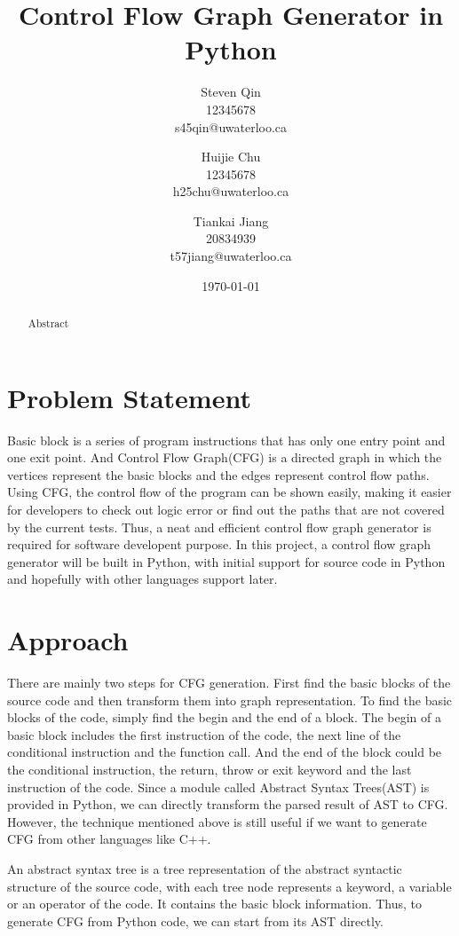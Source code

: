 \documentclass[11pt]{article}
\title{Control Flow Graph Generator in Python}
\author{Steven Qin\\12345678\\s45qin@uwaterloo.ca \and Huijie Chu\\12345678\\h25chu@uwaterloo.ca \and Tiankai Jiang\\20834939\\t57jiang@uwaterloo.ca}
\date{\today}
\begin{document}
\maketitle

\begin{abstract}
Abstract
\end{abstract}

\section{Problem Statement}\label{section-problemStatement}
Basic block is a series of program instructions that has only one entry point and one exit point. And Control Flow Graph(CFG) is a directed graph in which the vertices represent the basic blocks and the edges represent control flow paths. Using CFG, the control flow of the program can be shown easily, making it easier for developers to check out logic error or find out the paths that are not covered by the current tests. Thus, a neat and efficient control flow graph generator is required for software developent purpose. In this project, a control flow graph generator will be built in Python, with initial support for source code in Python and hopefully with other languages support later.

\section{Approach}\label{section-approach}
There are mainly two steps for CFG generation. First find the basic blocks of the source code and then transform them into graph representation. To find the basic blocks of the code, simply find the begin and the end of a block. The begin of a basic block includes the first instruction of the code, the next line of the conditional instruction and the function call. And the end of the block could be the conditional instruction, the return, throw or exit keyword and the last instruction of the code. Since a module called Abstract Syntax Trees(AST) is provided in Python, we can directly transform the parsed result of AST to CFG. However, the technique mentioned above is still useful if we want to generate CFG from other languages like C++.

An abstract syntax tree is a tree representation of the abstract syntactic structure of the source code, with each tree node represents a keyword, a variable or an operator of the code. It contains the basic block information. Thus, to generate CFG from Python code, we can start from its AST directly. 
\end{document}
